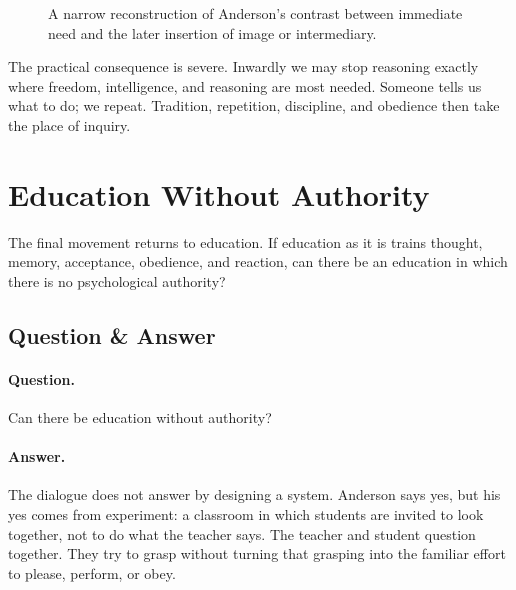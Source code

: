 \begin{figure}
\centering
{}
\caption{A narrow reconstruction of Anderson's contrast between immediate need and the later insertion of image or intermediary.}
\end{figure}

The practical consequence is severe. Inwardly we may stop reasoning exactly where freedom, intelligence, and reasoning are most needed. Someone tells us what to do; we repeat. Tradition, repetition, discipline, and obedience then take the place of inquiry.

\section{Education Without Authority}

The final movement returns to education. If education as it is trains thought, memory, acceptance, obedience, and reaction, can there be an education in which there is no psychological authority?

\subsection{Question \& Answer}

\paragraph{Question.}
Can there be education without authority?

\paragraph{Answer.}
The dialogue does not answer by designing a system. Anderson says yes, but his yes comes from experiment: a classroom in which students are invited to look together, not to do what the teacher says. The teacher and student question together. They try to grasp without turning that grasping into the familiar effort to please, perform, or obey.

